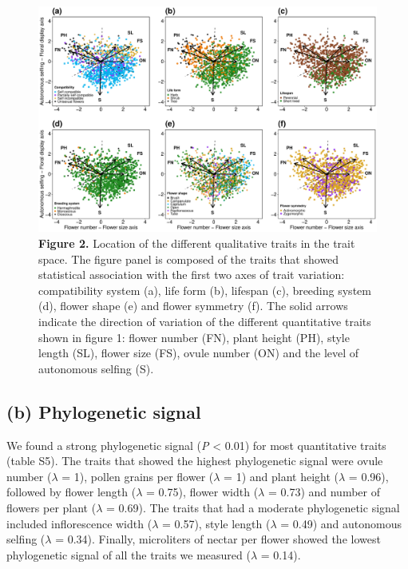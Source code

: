 \documentclass[
  12pt,
  a4paper,
]{article}
\newcommand{\blandscape}{\begin{landscape}}
\newcommand{\elandscape}{\end{landscape}}
\begin{document}
\blandscape

\begin{figure}[H]

{\centering \includegraphics[width=0.8\linewidth]{output/figures/unnamed-chunk-3-1} 

}

\caption{\textbf{Figure 2.} Location of the different qualitative traits in the trait space. The figure panel is composed of the traits that showed statistical association with the first two axes of trait variation: compatibility system (a), life form (b), lifespan (c), breeding system (d), flower shape (e) and flower symmetry (f). The solid arrows indicate the direction of variation of the different quantitative traits shown in figure 1: flower number (FN), plant height (PH), style length (SL), flower size (FS), ovule number (ON) and the level of autonomous selfing (S).}\label{fig:unnamed-chunk-3}
\end{figure}

\elandscape

\hypertarget{b-phylogenetic-signal}{%
\subsection{(b) Phylogenetic signal}\label{b-phylogenetic-signal}}

We found a strong phylogenetic signal (\emph{P} \textless{} 0.01) for most quantitative traits (table S5). The traits that showed the highest phylogenetic signal were ovule number (\(\lambda\) = 1), pollen grains per flower (\(\lambda\) = 1) and plant height (\(\lambda\) = 0.96), followed by flower length (\(\lambda\) = 0.75), flower width (\(\lambda\) = 0.73) and number of flowers per plant (\(\lambda\) = 0.69). The traits that had a moderate phylogenetic signal included inflorescence width (\(\lambda\) = 0.57), style length (\(\lambda\) = 0.49) and autonomous selfing (\(\lambda\) = 0.34). Finally, microliters of nectar per flower showed the lowest phylogenetic signal of all the traits we measured (\(\lambda\) = 0.14).
\end{document}
